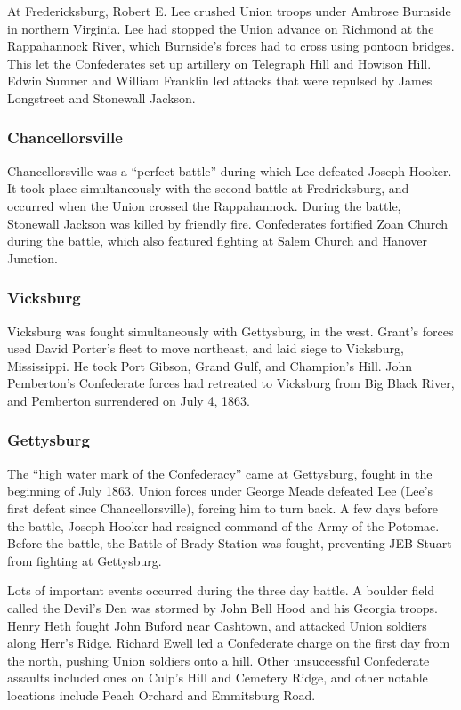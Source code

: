 At Fredericksburg, Robert E. Lee crushed Union troops under Ambrose Burnside in northern Virginia.
Lee had stopped the Union advance on Richmond at the Rappahannock River,
which Burnside's forces had to cross using pontoon bridges.
This let the Confederates set up artillery on Telegraph Hill and Howison Hill.
Edwin Sumner and William Franklin led attacks that were repulsed by James Longstreet and Stonewall Jackson.

\subsubsection*{Chancellorsville}

Chancellorsville was a ``perfect battle'' during which Lee defeated Joseph Hooker.
It took place simultaneously with the second battle at Fredricksburg,
and occurred when the Union crossed the Rappahannock.
During the battle, Stonewall Jackson was killed by friendly fire.
Confederates fortified Zoan Church during the battle,
which also featured fighting at Salem Church and Hanover Junction.

\subsubsection*{Vicksburg}

Vicksburg was fought simultaneously with Gettysburg, in the west.
Grant's forces used David Porter's fleet to move northeast, and laid siege to Vicksburg, Mississippi.
He took Port Gibson, Grand Gulf, and Champion's Hill.
John Pemberton's Confederate forces had retreated to Vicksburg from Big Black River,
and Pemberton surrendered on July 4, 1863.

\subsubsection*{Gettysburg}

The ``high water mark of the Confederacy'' came at Gettysburg, fought in the beginning of July 1863.
Union forces under George Meade defeated Lee (Lee's first defeat since Chancellorsville), forcing him to turn back.
A few days before the battle, Joseph Hooker had resigned command of the Army of the Potomac.
Before the battle, the Battle of Brady Station was fought, preventing JEB Stuart from fighting at Gettysburg.

Lots of important events occurred during the three day battle.
A boulder field called the Devil's Den was stormed by John Bell Hood and his Georgia troops.
Henry Heth fought John Buford near Cashtown, and attacked Union soldiers along Herr's Ridge.
Richard Ewell led a Confederate charge on the first day from the north, pushing Union soldiers onto a hill.
Other unsuccessful Confederate assaults included ones on Culp's Hill and Cemetery Ridge,
and other notable locations include Peach Orchard and Emmitsburg Road.

